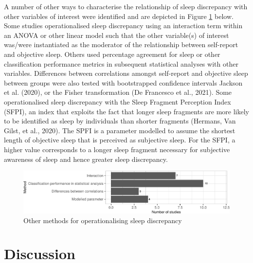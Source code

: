 \documentclass[
]{article}
\begin{document}
A number of other ways to characterise the relationship of sleep discrepancy with other variables of interest were identified and are depicted in Figure \ref{fig:otherm} below. Some studies operationalised sleep discrepancy using an interaction term within an ANOVA or other linear model such that the other variable(s) of interest was/were instantiated as the moderator of the relationship between self-report and objective sleep. Others used percentage agreement for sleep or other classification performance metrics in subsequent statistical analyses with other variables. Differences between correlations amongst self-report and objective sleep between groups were also tested with bootstrapped confidence intervals Jackson et al. (2020), or the Fisher transformation (De Francesco et al., 2021). Some operationalised sleep discrepancy with the Sleep Fragment Perception Index (SFPI), an index that exploits the fact that longer sleep fragments are more likely to be identified as sleep by individuals than shorter fragments (Hermans, Van Gilst, et al., 2020). The SPFI is a parameter modelled to assume the shortest length of objective sleep that is perceived as subjective sleep. For the SFPI, a higher value corresponds to a longer sleep fragment necessary for subjective awareness of sleep and hence greater sleep discrepancy.

\begin{figure}
\centering
\includegraphics{review_markdown_files/figure-latex/otherm-1.pdf}
\caption{\label{fig:otherm}Other methods for operationalising sleep discrepancy}
\end{figure}

\section{Discussion}\label{item19}
\end{document}
